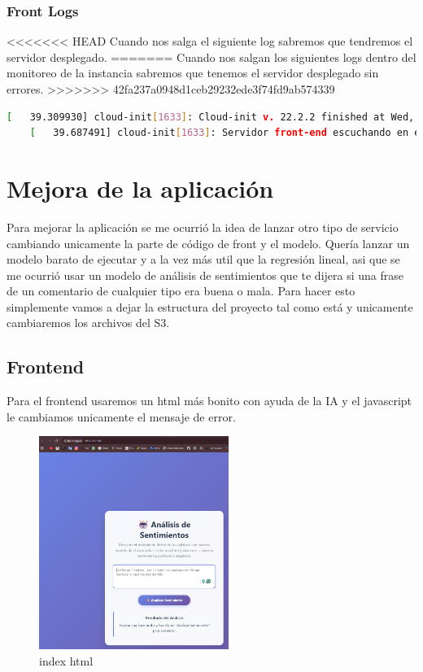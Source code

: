 \documentclass{article}
\begin{document}
	\subsubsection{Front Logs}
<<<<<<< HEAD
	Cuando nos salga el siguiente log sabremos que tendremos el servidor desplegado.
=======
	Cuando nos salgan los siguientes logs dentro del monitoreo de la instancia sabremos que tenemos el servidor desplegado sin errores.
>>>>>>> 42fa237a0948d1ceb29232ede3f74fd9ab574339

 	\begin{lstlisting}[style=consola, language=bash, caption={front logs}]
	[   39.309930] cloud-init[1633]: Cloud-init v. 22.2.2 finished at Wed, 01 Oct 2025 21:42:02 +0000. Datasource DataSourceEc2.  Up 39.29 seconds
	[   39.687491] cloud-init[1633]: Servidor front-end escuchando en el puerto 80 \end{lstlisting}

	\section{Mejora de la aplicación}

	Para mejorar la aplicación se me ocurrió la idea de lanzar otro tipo de servicio cambiando unicamente la parte de código de front y el modelo. Quería lanzar un modelo barato de ejecutar y a la vez más util que la regresión lineal, asi que se me ocurrió usar un modelo de análisis de sentimientos que te dijera si una frase de un comentario de cualquier tipo era buena o mala. Para hacer esto simplemente vamos a dejar la estructura del proyecto tal como está y unicamente cambiaremos los archivos del S3.

	\subsection{Frontend}
	Para el frontend usaremos un html más bonito con ayuda de la IA y el javascript le cambiamos unicamente el mensaje de error.

			
	\begin{figure}[H]
	\centering
	\includegraphics[width=0.55\textwidth]{prueba1.png}
	\caption{index html}
	\end{figure}
\end{document}
